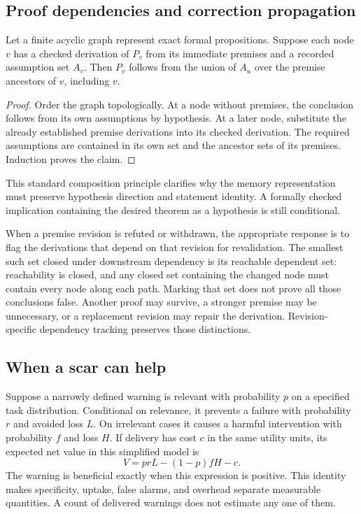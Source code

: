 \subsection{Proof dependencies and correction propagation}

\begin{proposition}
Let a finite acyclic graph represent exact formal propositions. Suppose each node $v$ has a checked derivation of $P_v$ from its immediate premises and a recorded assumption set $A_v$. Then $P_v$ follows from the union of $A_u$ over the premise ancestors of $v$, including $v$.
\end{proposition}
\begin{proof}
Order the graph topologically. At a node without premises, the conclusion follows from its own assumptions by hypothesis. At a later node, substitute the already established premise derivations into its checked derivation. The required assumptions are contained in its own set and the ancestor sets of its premises. Induction proves the claim.
\end{proof}

This standard composition principle clarifies why the memory representation must preserve hypothesis direction and statement identity. A formally checked implication containing the desired theorem as a hypothesis is still conditional.

When a premise revision is refuted or withdrawn, the appropriate response is to flag the derivations that depend on that revision for revalidation. The smallest such set closed under downstream dependency is its reachable dependent set: reachability is closed, and any closed set containing the changed node must contain every node along each path. Marking that set does not prove all those conclusions false. Another proof may survive, a stronger premise may be unnecessary, or a replacement revision may repair the derivation. Revision-specific dependency tracking preserves those distinctions.

\subsection{When a scar can help}

Suppose a narrowly defined warning is relevant with probability $p$ on a specified task distribution. Conditional on relevance, it prevents a failure with probability $r$ and avoided loss $L$. On irrelevant cases it causes a harmful intervention with probability $f$ and loss $H$. If delivery has cost $c$ in the same utility units, its expected net value in this simplified model is
\[
V=prL-(1-p)fH-c.
\]
The warning is beneficial exactly when this expression is positive. This identity makes specificity, uptake, false alarms, and overhead separate measurable quantities. A count of delivered warnings does not estimate any one of them.

